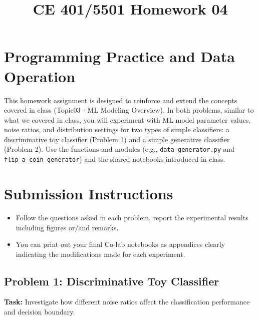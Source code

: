 \documentclass[12pt]{article}
\begin{document}
\doublespacing	

\title{CE 401/5501 Homework 04\\
\vspace{2in}
\author{}
}
\maketitle

\newcommand*{\I}{\imath} %

\newpage

\section{Programming Practice and Data Operation}
This homework assignment is designed to reinforce and extend the concepts covered in class (Topic03 - ML Modeling Overview). In both problems, similar to what we covered in class, you will experiment with ML model parameter values, noise ratios, and distribution settings for two types of simple classifiers: a discriminative  toy classifier (Problem 1) and a simple generative classifier (Problem 2). Use the functions and modules (e.g., \texttt{data\_generator.py} and \texttt{flip\_a\_coin\_generator}) and the shared notebooks introduced in class.

\section*{Submission Instructions}
\begin{itemize}
    \item Follow the questions asked in each problem, report the experimental results including figures or/and remarks. 
    \item You can print out your final Co-lab notebooks as appendices clearly indicating the modifications made for each experiment.
\end{itemize}


\subsection*{Problem 1: Discriminative Toy Classifier}
\textbf{Task:} Investigate how different noise ratios affect the classification performance and decision boundary.
\end{document}
